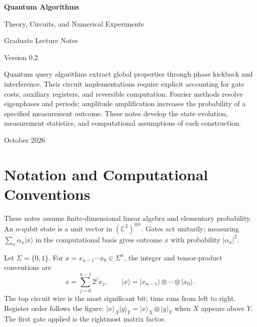 \documentclass[11pt,oneside,openany]{book}
\providecommand{\ket}{}
\renewcommand{\ket}[1]{\lvert #1\rangle}
\theoremstyle{definition}
\begin{document}
\frontmatter
\begin{titlepage}
\vspace*{25mm}
\begin{center}
{\Huge\bfseries Quantum Algorithms\par}
\vspace{9mm}
{\Large Theory, Circuits, and Numerical Experiments\par}
\vspace{15mm}
{\large Graduate Lecture Notes\par}
\vspace{6mm}
{\large Version 0.2\par}
\vspace{22mm}
\begin{minipage}{0.82\textwidth}
Quantum query algorithms extract global properties through phase kickback and interference. Their circuit implementations require explicit accounting for gate costs, auxiliary registers, and reversible computation. Fourier methods resolve eigenphases and periods; amplitude amplification increases the probability of a specified measurement outcome. These notes develop the state evolution, measurement statistics, and computational assumptions of each construction.
\end{minipage}
\vfill
October 2026\par
\end{center}
\end{titlepage}
\chapter*{Notation and Computational Conventions}
These notes assume finite-dimensional linear algebra and elementary probability. An $n$-qubit state is a unit vector in $(\mathbb C^2)^{\otimes n}$. Gates act unitarily; measuring $\sum_x\alpha_x\ket x$ in the computational basis gives outcome $x$ with probability $|\alpha_x|^2$.

Let $\Sigma=\{0,1\}$. For $x=x_{n-1}\cdots x_0\in\Sigma^n$, the integer and tensor-product conventions are
\begin{equation}
 x=\sum_{j=0}^{n-1}2^j x_j,\qquad
 \ket x=\ket{x_{n-1}}\otimes\cdots\otimes\ket{x_0}.
\end{equation}
The top circuit wire is the most significant bit; time runs from left to right. Register order follows the figure: $\ket x_X\ket y_Y=\ket x_X\otimes\ket y_Y$ when $X$ appears above $Y$. The first gate applied is the rightmost matrix factor.
\end{document}
